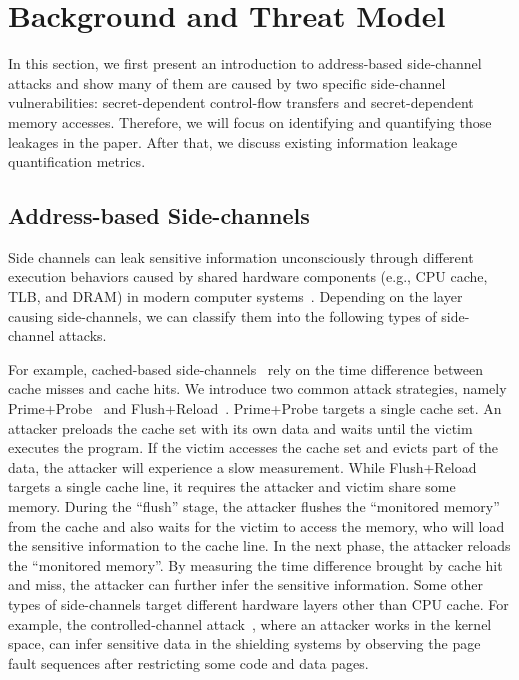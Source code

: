 \section{Background and Threat Model}
In this section, we first present an introduction to address-based side-channel
attacks and show many of them are caused by two specific side-channel
vulnerabilities: secret-dependent control-flow transfers and secret-dependent
memory accesses. Therefore, we will focus on identifying and quantifying those
leakages in the paper. After that, we discuss existing information leakage quantification 
metrics.

\subsection{Address-based Side-channels}
Side channels can leak sensitive information
unconsciously through different execution behaviors caused by shared 
hardware components (e.g., CPU cache, TLB, and
DRAM) in modern computer systems~\cite{ge2018survey,szefer2019survey}. Depending
on the layer causing side-channels, we can classify them into the following
types of side-channel attacks.

For example, cached-based
side-channels~\cite{yarom2017cachebleed,191010,184415,7163050,Osvik2006,liu2015last,yarom2014flush+}
rely on the time difference between cache misses and cache hits. We introduce two
common attack strategies, namely Prime+Probe~\cite{liu2015last} and
Flush+Reload~\cite{yarom2014flush+}. Prime+Probe targets a single cache set. An
attacker preloads the cache set with its own data and waits until the victim
executes the program. If the victim accesses the cache set and evicts part of
the data, the attacker will experience a slow measurement. 
While Flush+Reload targets a
single cache line, it requires the attacker and victim share some memory. 
During the ``flush'' stage, the attacker flushes the ``monitored
memory'' from the cache and also waits for the victim to access the memory,
who will load the sensitive information to the cache line. In the next phase,
the attacker reloads the ``monitored memory''. By measuring the time difference
brought by cache hit and miss, the attacker can further infer the sensitive information.
Some other types of side-channels target different hardware
layers other than CPU cache. For example, the controlled-channel
attack~\cite{7163052}, where an attacker works in the kernel space, can infer
sensitive data in the shielding systems by observing the page fault sequences
after restricting some code and data pages.

